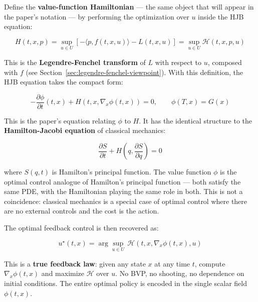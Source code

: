 \documentclass{article}
\begin{document}
\begin{tldrbox}
Define the \textbf{value-function Hamiltonian} — the same object that will appear in the paper's notation — by performing the optimization over $u$ inside the HJB equation:

\begin{equation}
H(t, x, p) = \sup_{u \in U} \left[ -\langle p, f(t, x, u) \rangle - L(t, x, u) \right] = \sup_{u \in U} \mathcal{H}(t, x, p, u)
\label{eq:optimized-hamiltonian}
\end{equation}

This is the \textbf{Legendre-Fenchel transform} of $L$ with respect to $u$, composed with $f$ (see Section~\ref{sec:legendre-fenchel-viewpoint}). With this definition, the HJB equation takes the compact form:

\begin{equation}
-\frac{\partial \phi}{\partial t}(t, x) + H(t, x, \nabla_x \phi(t, x)) = 0, \qquad \phi(T, x) = G(x)
\label{eq:hjb-hamiltonian-form}
\end{equation}

\begin{physicsinsightbox}
This is the paper's equation relating $\phi$ to $H$. It has the identical structure to the \textbf{Hamilton-Jacobi equation} of classical mechanics:

$$\frac{\partial S}{\partial t} + H\!\left(q, \frac{\partial S}{\partial q}\right) = 0$$

where $S(q,t)$ is Hamilton's principal function. The value function $\phi$ is the optimal control analogue of Hamilton's principal function — both satisfy the same PDE, with the Hamiltonian playing the same role in both. This is not a coincidence: classical mechanics is a special case of optimal control where there are no external controls and the cost is the action.
\end{physicsinsightbox}

The optimal feedback control is then recovered as:

\begin{equation}
u^\star(t, x) = \arg\sup_{u \in U}\, \mathcal{H}(t, x, \nabla_x \phi(t, x), u)
\label{eq:hjb-feedback}
\end{equation}

This is a \textbf{true feedback law}: given any state $x$ at any time $t$, compute $\nabla_x \phi(t, x)$ and maximize $\mathcal{H}$ over $u$. No BVP, no shooting, no dependence on initial conditions. The entire optimal policy is encoded in the single scalar field $\phi(t, x)$.
\end{tldrbox}
\end{document}
